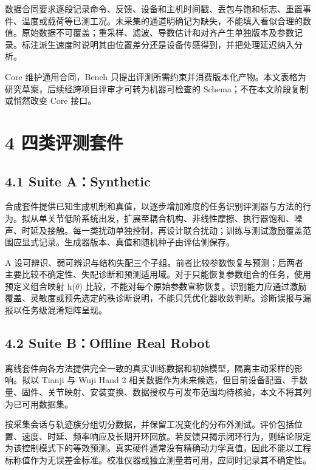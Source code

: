 \documentclass[
  chinese,
  11pt,
  a4paper,
  fontset=fandol]{ctexart}
\begin{document}
数据合同要求逐段记录命令、反馈、设备和主机时间戳、丢包与饱和标志、重置事件、温度或载荷等已测工况。未采集的通道明确记为缺失，不能填入看似合理的数值。原始数据不可覆盖；重采样、滤波、导数估计和对齐产生单独版本及参数记录。标注派生速度时说明其由位置差分还是设备传感得到，并把处理延迟纳入分析。

Core 维护通用合同，Bench
只提出评测所需约束并消费版本化产物。本文表格为研究草案，后续经跨项目评审才可转为机器可检查的
Schema；不在本文阶段复制或悄然改变 Core 接口。

\section{4 四类评测套件}\label{ux56dbux7c7bux8bc4ux6d4bux5957ux4ef6}

\subsection{4.1 Suite A：Synthetic}\label{suite-asynthetic}

合成套件提供已知生成机制和真值，以逐步增加难度的任务识别评测器与方法的行为。拟从单关节低阶系统出发，扩展至耦合机构、非线性摩擦、执行器饱和、噪声、时延及接触。每一类扰动单独控制，再设计联合扰动；训练与测试激励覆盖范围应显式记录。生成器版本、真值和随机种子由评估侧保存。

A
设可辨识、弱可辨识与结构失配三个子组。前者比较参数恢复与预测；后两者主要比较不确定性、失配诊断和预测适用域。对于只能恢复参数组合的任务，使用预定义组合映射
h(\(\theta\))
比较，不能对每个原始参数宣称恢复。识别能力应通过激励覆盖、灵敏度或预先选定的秩诊断说明，不能只凭优化器收敛判断。诊断误报与漏报以任务级混淆矩阵呈现。

\subsection{4.2 Suite B：Offline Real
Robot}\label{suite-boffline-real-robot}

离线套件向各方法提供完全一致的真实训练数据和初始模型，隔离主动采样的影响。拟以
Tianji 与 Wuji Hand 2
相关数据作为未来候选，但目前设备配置、手数量、固件、关节映射、安装变换、数据授权与可发布范围均待核验，本文不将其列为已可用数据集。

按采集会话与轨迹族分组切分数据，并保留工况变化的分布外测试。评价包括位置、速度、时延、频率响应及长期开环回放。若反馈只揭示闭环行为，则结论限定为该控制模式下的等效预测。真实硬件通常没有精确动力学真值，因此不能以工程标称值作为无误差金标准。校准仪器或独立测量若可用，应同时记录其不确定性。
\end{document}
